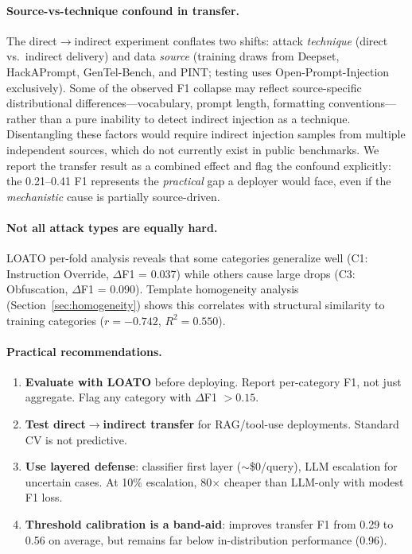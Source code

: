 \documentclass[conference]{IEEEtran}
\newcommand{\df}{$\Delta$F1}
\newcommand{\Fone}{F1}
\begin{document}
\paragraph{Source-vs-technique confound in transfer.}
The direct$\to$indirect experiment conflates two shifts: attack
\emph{technique} (direct vs.\ indirect delivery) and data \emph{source}
(training draws from Deepset, HackAPrompt, GenTel-Bench, and PINT; testing
uses Open-Prompt-Injection exclusively). Some of the observed \Fone{} collapse
may reflect source-specific distributional differences---vocabulary, prompt
length, formatting conventions---rather than a pure inability to detect
indirect injection as a technique. Disentangling these factors would require
indirect injection samples from multiple independent sources, which do not
currently exist in public benchmarks. We report the transfer result as a
combined effect and flag the confound explicitly: the 0.21--0.41 \Fone{}
represents the \emph{practical} gap a deployer would face, even if the
\emph{mechanistic} cause is partially source-driven.

\paragraph{Not all attack types are equally hard.}
LOATO per-fold analysis reveals that some categories generalize well (C1:
Instruction Override, \df{} = 0.037) while others cause large drops (C3:
Obfuscation, \df{} = 0.090). Template homogeneity analysis
(Section~\ref{sec:homogeneity}) shows this correlates with structural similarity
to training categories ($r = -0.742$, $R^2 = 0.550$).

\paragraph{Practical recommendations.}
\begin{enumerate}[nosep,leftmargin=*]
\item \textbf{Evaluate with LOATO} before deploying. Report per-category
  \Fone{}, not just aggregate. Flag any category with \df{} $> 0.15$.
\item \textbf{Test direct$\to$indirect transfer} for RAG/tool-use deployments.
  Standard CV is not predictive.
\item \textbf{Use layered defense}: classifier first layer ($\sim$\$0/query),
  LLM escalation for uncertain cases. At 10\% escalation, 80$\times$ cheaper
  than LLM-only with modest \Fone{} loss.
\item \textbf{Threshold calibration is a band-aid}: improves transfer \Fone{}
  from 0.29 to 0.56 on average, but remains far below in-distribution
  performance (0.96).
\end{enumerate}
\end{document}
